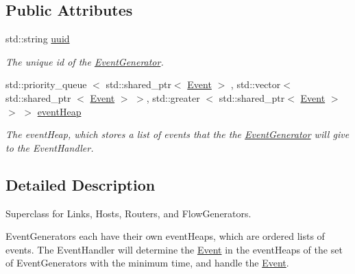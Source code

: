 \subsection*{\-Public \-Attributes}
\begin{DoxyCompactItemize}
\item 
std\-::string \hyperlink{classEventGenerator_af4fa28d08ed4a3be31f9383cf72e0d2c}{uuid}
\begin{DoxyCompactList}\small\item\em \-The unique id of the \hyperlink{classEventGenerator}{\-Event\-Generator}. \end{DoxyCompactList}\item 
\hypertarget{classEventGenerator_a3e9a33f75d9861bece6c30b5249c9d39}{std\-::priority\-\_\-queue\*
$<$ std\-::shared\-\_\-ptr$<$ \hyperlink{classEvent}{\-Event} $>$\*
, std\-::vector$<$ std\-::shared\-\_\-ptr\*
$<$ \hyperlink{classEvent}{\-Event} $>$ $>$, std\-::greater\*
$<$ std\-::shared\-\_\-ptr$<$ \hyperlink{classEvent}{\-Event} $>$ $>$ $>$ \hyperlink{classEventGenerator_a3e9a33f75d9861bece6c30b5249c9d39}{event\-Heap}}\label{classEventGenerator_a3e9a33f75d9861bece6c30b5249c9d39}

\begin{DoxyCompactList}\small\item\em \-The event\-Heap, which stores a list of events that the the \hyperlink{classEventGenerator}{\-Event\-Generator} will give to the \-Event\-Handler. \end{DoxyCompactList}\end{DoxyCompactItemize}


\subsection{\-Detailed \-Description}
\-Superclass for \-Links, \-Hosts, \-Routers, and \-Flow\-Generators. 

\-Event\-Generators each have their own event\-Heaps, which are ordered lists of events. \-The \-Event\-Handler will determine the \hyperlink{classEvent}{\-Event} in the event\-Heaps of the set of \-Event\-Generators with the minimum time, and handle the \hyperlink{classEvent}{\-Event}. 

